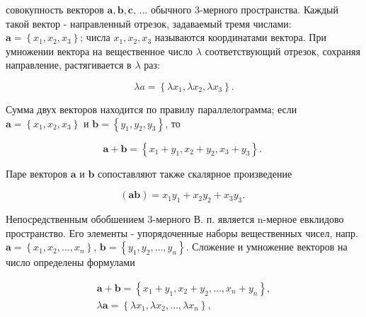 \documentclass[10pt]{article}
\begin{document}
совокупность векторов $\boldsymbol{a}, \boldsymbol{b}, \boldsymbol{c}$, ... обычного 3-мерного пространства. Каждый такой вектор - направленный отрезок, задаваемый тремя числами: $\boldsymbol{a}=\left\{x_{1}, x_{2}, x_{3}\right\}$; числа $x_{1}, x_{2}, x_{3}$ называются координатами вектора. При умножении вектора на вещественное число $\lambda$ соответствующий отрезок, сохраняя направление, растягивается в $\lambda$ раз:



\[

\lambda a=\left\{\lambda x_{1}, \lambda x_{2}, \lambda x_{3}\right\} .

\]



Сумма двух векторов находится по правилу параллелограмма; если $\boldsymbol{a}=\left\{x_{1}, x_{2}, x_{3}\right\}$ и $\boldsymbol{b}=\left\{y_{1}, y_{2}, y_{3}\right\}$, то



\[

\boldsymbol{a}+\boldsymbol{b}=\left\{x_{1}+y_{1}, x_{2}+y_{2}, x_{3}+y_{3}\right\} \text {. }

\]



Паре векторов $\boldsymbol{a}$ и $\boldsymbol{b}$ сопоставляют также скалярное произведение



\[

(\boldsymbol{a b})=x_{1} y_{1}+x_{2} y_{2}+x_{3} y_{3} \text {. }

\]



Непосредственным обобшением 3-мерного В. п. является n-мерное евклидово пространство. Его элементы - упорядоченные наборы вещественных чисел, напр. $\boldsymbol{a}=\left\{x_{1}, x_{2}, \ldots, x_{n}\right\}$, $\boldsymbol{b}=\left\{y_{1}, y_{2}, \ldots, y_{n}\right\}$. Сложение и умножение векторов на число определены формулами



\[

\begin{gathered}

\boldsymbol{a}+\boldsymbol{b}=\left\{x_{1}+y_{1}, x_{2}+y_{2}, \ldots, x_{n}+y_{n}\right\}, \\

\lambda \boldsymbol{a}=\left\{\lambda x_{1}, \lambda x_{2}, \ldots, \lambda x_{n}\right\},

\end{gathered}

\]
\end{document}
